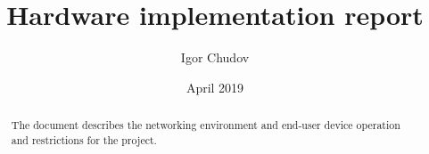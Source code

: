 \documentclass[a4paper]{report}
\begin{document}
\title{Hardware implementation report}
\author{Igor Chudov}
\date{April 2019}
\maketitle
\tableofcontents

\begin{abstract}
The document describes the networking environment and end-user device
operation and restrictions for the project.
\end{abstract}




\end{document}
